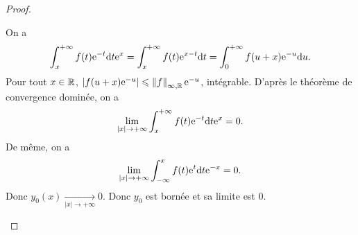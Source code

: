 \documentclass[12pt]{article}
\begin{document}
\begin{proof}
\begin{enumerate}
		On a 
		\begin{equation*}
			\int_{x}^{+\infty}f(t)\mathrm{e}^{-t}\mathrm{d} t\mathrm{e}^{x}=\int_{x}^{+\infty}f(t)\mathrm{e}^{x-t}\mathrm{d} t=\int_{0}^{+\infty}f(u+x)\mathrm{e}^{-u}\mathrm{d} u.
		\end{equation*}
		Pour tout $x\in\mathbb{R}$, $\left\lvert f(u+x)\mathrm{e}^{-u}\right\rvert\leqslant\left\lVert f\right\rVert_{\infty,\mathbb{R}}\mathrm{e}^{-u}$, intégrable. D'après le théorème de convergence dominée, on a 
		\begin{equation*}
			\lim\limits_{\left\lvert x\right\rvert\to+\infty}\int_{x}^{+\infty}f(t)\mathrm{e}^{-t}\mathrm{d} t\mathrm{e}^{x}=0.
		\end{equation*}
		De même, on a 
		\begin{equation*}
			\lim\limits_{\left\lvert x\right\rvert\to+\infty}\int_{-\infty}^{x}f(t)\mathrm{e}^{t}\mathrm{d} t\mathrm{e}^{-x}=0.
		\end{equation*}
		Donc $y_0(x)\xrightarrow[\left\lvert x\right\rvert\to+\infty]{}0$. Donc $y_0$ est bornée et sa limite est 0.
	\end{enumerate}
\end{proof}
\end{document}
